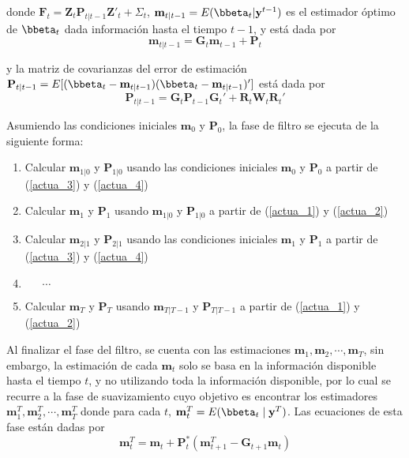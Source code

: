 donde $\mathbf{F}_t=\mathbf{Z}_t\mathbf{P}_{t|t-1}\mathbf{Z}'_t+\Sigma_t$, $\mathbf{m}_{t|t-1}=E(\bbeta_{t}|\mathbf{y}^{t-1})$ es el estimador óptimo de $\bbeta_t$ dada información hasta el tiempo $t-1$, y está dada por
\begin{equation}\label{actua_3}
\mathbf{m}_{t|t-1}=\mathbf{G}_{t}\mathbf{m}_{t-1}+\mathbf{P}_{t}
\end{equation}

y la matriz de covarianzas del error de estimación $\mathbf{P}_{t|t-1}=E[(\bbeta_t-\mathbf{m}_{t|t-1})(\bbeta_t-\mathbf{m}_{t|t-1})']$ está dada por
\begin{equation}\label{actua_4}
\mathbf{P}_{t|t-1}=\mathbf{G}_{t}\mathbf{P}_{t-1}\mathbf{G}_t'+\mathbf{R}_{t}\mathbf{W}_{t}\mathbf{R}_{t}'
\end{equation}

Asumiendo las condiciones iniciales $\mathbf{m}_0$ y $\mathbf{P}_0$, la fase de filtro se ejecuta de la siguiente forma:
\begin{enumerate}
\item Calcular $\mathbf{m}_{1|0}$ y $\mathbf{P}_{1|0}$ usando las condiciones iniciales $\mathbf{m}_0$ y $\mathbf{P}_0$ a partir de (\ref{actua_3}) y (\ref{actua_4}) 
\item Calcular $\mathbf{m}_{1}$ y $\mathbf{P}_{1}$ usando $\mathbf{m}_{1|0}$ y $\mathbf{P}_{1|0}$ a partir de (\ref{actua_1}) y (\ref{actua_2}) 
\item Calcular $\mathbf{m}_{2|1}$ y $\mathbf{P}_{2|1}$ usando las condiciones iniciales $\mathbf{m}_1$ y $\mathbf{P}_1$ a partir de (\ref{actua_3}) y (\ref{actua_4}) 
\item $\ \ \ \ \ \ \ \cdots$
\item Calcular $\mathbf{m}_{T}$ y $\mathbf{P}_{T}$ usando $\mathbf{m}_{T|T-1}$ y $\mathbf{P}_{T|T-1}$ a partir de (\ref{actua_1}) y (\ref{actua_2}) 
\end{enumerate}

Al finalizar el fase del filtro, se cuenta con las estimaciones $\mathbf{m}_1,\mathbf{m}_2,\cdots,\mathbf{m}_T$, sin embargo, la estimación de cada $\mathbf{m}_t$ solo se basa en la información disponible hasta el tiempo $t$, y no utilizando toda la información disponible, por lo cual se recurre a la fase de suavizamiento cuyo objetivo es encontrar los estimadores $\mathbf{m}_1^T,\mathbf{m}_2^T,\cdots,\mathbf{m}_T^T$ donde para cada $t$, $\mathbf{m}_t^T=E(\bbeta_t\mid\mathbf{y}^T)$. Las ecuaciones de esta fase están dadas por
\begin{equation}\label{Suavi_1}
\mathbf{m}_t^T=\mathbf{m}_t+\mathbf{P}_t^*(\mathbf{m}_{t+1}^T-\mathbf{G}_{t+1}\mathbf{m}_t)
\end{equation}

